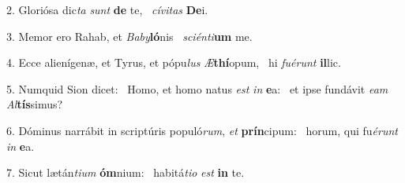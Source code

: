 2. Gloriósa dic\textit{ta} \textit{sunt} \textbf{de} te, \ast\  \textit{cí}\textit{vi}\textit{tas} \textbf{De}i.\

3. Memor ero Rahab, et \textit{Ba}\textit{by}\textbf{ló}nis \ast\  \textit{sci}\textit{én}\textit{ti}\textbf{um} me.\

4. Ecce alienígenæ, et Tyrus, et pópu\textit{lus} \textit{Æ}\textbf{thí}opum, \ast\  hi \textit{fu}\textit{é}\textit{runt} \textbf{il}lic.\

5. Numquid Sion dicet: \dag\  Homo, et homo natus \textit{est} \textit{in} \textbf{e}a: \ast\  et ipse fundávit \textit{e}\textit{am} \textit{Al}\textbf{tís}simus?\

6. Dóminus narrábit in scriptúris populó\textit{rum}, \textit{et} \textbf{prín}cipum: \ast\  horum, qui fu\textit{é}\textit{runt} \textit{in} \textbf{e}a.\

7. Sicut lætán\textit{ti}\textit{um} \textbf{óm}nium: \ast\  habitá\textit{ti}\textit{o} \textit{est} \textbf{in} te.\

